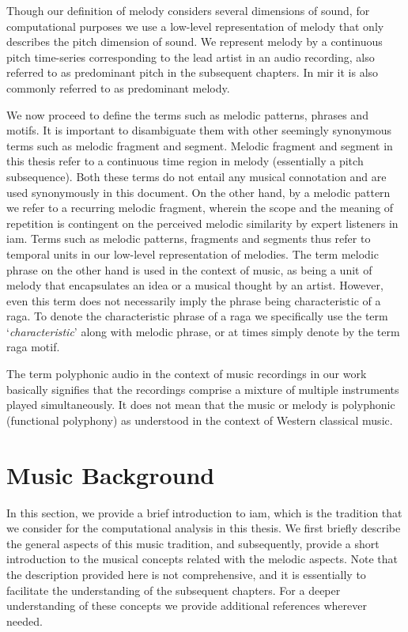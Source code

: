 Though our definition of melody considers several dimensions of sound, for computational purposes we use a low-level representation of melody that only describes the pitch dimension of sound. We represent melody by a continuous pitch time-series corresponding to the lead artist in an audio recording, also referred to as predominant pitch in the subsequent chapters. In \gls{mir} it is also commonly referred to as predominant melody. 

We now proceed to define the terms such as melodic patterns, phrases and motifs. It is important to disambiguate them with other seemingly synonymous terms such as melodic fragment and segment. Melodic fragment and segment in this thesis refer to a continuous time region in melody (essentially a pitch subsequence). Both these terms do not entail any musical connotation and are used synonymously in this document. On the other hand, by a melodic pattern we refer to a recurring melodic fragment, wherein the scope and the meaning of repetition is contingent on the perceived melodic similarity by expert listeners in \gls{iam}.  Terms such as melodic patterns, fragments and segments thus refer to temporal units in our low-level representation of melodies. The term melodic phrase on the other hand is used in the context of music, as being a unit of melody that encapsulates an idea or a musical thought by an artist. However, even this term does not necessarily imply the phrase being characteristic of a \gls{raga}. To denote the characteristic phrase of a \gls{raga} we specifically use the term `\textit{characteristic}' along with melodic phrase, or at times simply denote by the term \gls{raga} motif. 

The term polyphonic audio in the context of music recordings in our work basically signifies that the recordings comprise a mixture of multiple instruments played simultaneously. It does not mean that the music or melody is polyphonic (functional polyphony) as understood in the context of Western classical music.

\section{Music Background}
\label{sec:music_background}

In this section, we provide a brief introduction to \gls{iam}, which is the tradition that we consider for the computational analysis in this thesis. We first briefly describe the general aspects of this  music tradition, and subsequently, provide a short introduction to the musical concepts related with the melodic aspects. Note that the description provided here is not comprehensive, and it is essentially to facilitate the understanding of the subsequent chapters. For a deeper understanding of these concepts we provide additional references wherever needed. 

